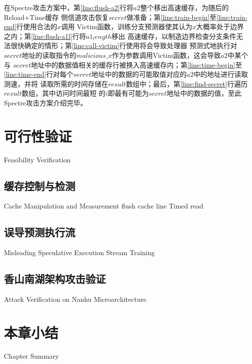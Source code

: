 在Spectre攻击方案中，第\ref{line:flush-a2}行将$a2$整个移出高速缓存，为随后的Reload+Time缓存
侧信道攻击恢复$secret$做准备；第\ref{line:train-begin}至\ref{line:train-end}行使用合法的$x$调用
Victim函数，训练分支预测器使其认为$x$大概率处于边界之内；第\ref{line:flush-a1l}行将$a1_length$移出
高速缓存，以制造边界检查分支条件无法很快确定的情形；第\ref{line:call-victim}行使用将会导致处理器
预测式地执行对$secret$地址的读取指令的$malicious\_x$作为参数调用Victim函数，这会导致$a2$中某个与
$secret$地址中的数据值相关的缓存行被换入高速缓存内；第\ref{line:time-begin}至
\ref{line:time-end}行对每个$secret$地址中的数据的可能取值对应的$a2$中的地址进行读取测速，并将
读取所需的时间存储在$result$数组中；最后，第\ref{line:find-secret}行遍历$result$数组，其中访问时间最短
的$i$即最有可能为$secret$地址中的数据的值，至此Spectre攻击方案介绍完毕。

\section{可行性验证}{Feasibility Verification}
\somewords
\subsection{缓存控制与检测}{Cache Manipulation and Measurement}
flush cache line
Timed read
\subsection{误导预测执行流}{Misleading Speculative Execution Stream}
Training
\subsection{香山南湖架构攻击验证}{Attack Verification on Nanhu Microarchitecture}
\somewords


\section{本章小结}{Chapter Summary}
\somewords


\newpage
